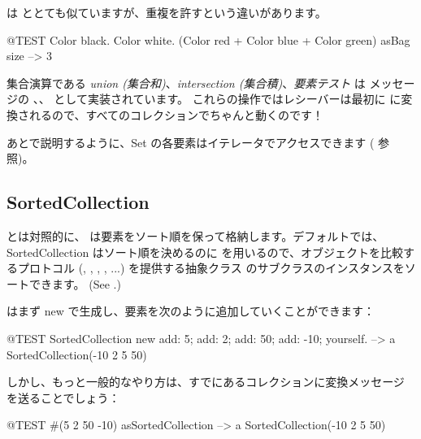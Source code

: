 \documentclass[a4paper,10pt,twoside]{book}
\begin{document}
 は  ととても似ていますが、重複を許すという違いがあります。
\begin{code}{@TEST}
{ Color black. Color white. (Color red + Color blue + Color green) } asBag size --> 3
\end{code}

集合演算である \emph{union (集合和)}、\emph{intersection (集合積)}、\emph{要素テスト} は  メッセージの 、、 として実装されています。
これらの操作ではレシーバーは最初に  に変換されるので、すべてのコレクションでちゃんと動くのです！


あとで説明するように、Set の各要素はイテレータでアクセスできます ( 参照)。

\subsection{SortedCollection}
 とは対照的に、 は要素をソート順を保って格納します。デフォルトでは、SortedCollection はソート順を決めるのに  を用いるので、オブジェクトを比較するプロトコル (, , , , ...) を提供する抽象クラス  のサブクラスのインスタンスをソートできます。
(See .)

 はまず new で生成し、要素を次のように追加していくことができます：
\begin{code}{@TEST}
SortedCollection new add: 5; add: 2; add: 50; add: -10; yourself. --> a SortedCollection(-10 2 5 50)
\end{code}

\noindent
しかし、もっと一般的なやり方は、すでにあるコレクションに変換メッセージ  を送ることでしょう：
\begin{code}{@TEST}
#(5 2 50 -10) asSortedCollection --> a SortedCollection(-10 2 5 50)
\end{code}
\end{document}
